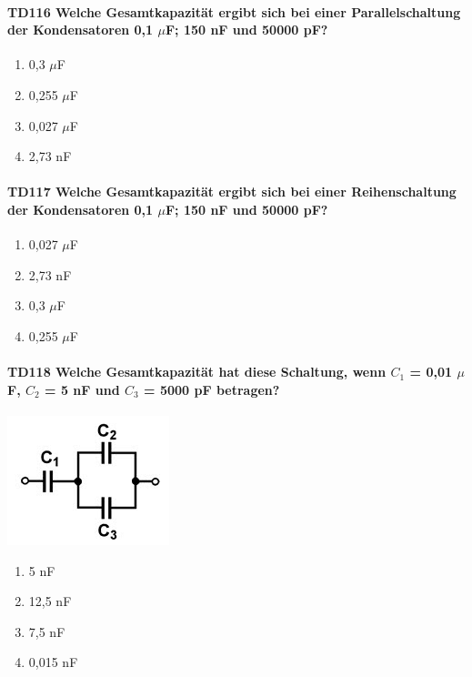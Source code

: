 \documentclass[8pt]{article}
\begin{document}
\begin{enumerate}
\begin{enumerate}[nolistsep,label=\Alph*]
\paragraph*{TD116 Welche Gesamtkapazität ergibt sich bei einer Parallelschaltung der Kondensatoren 0,1 $\mu$F; 150 nF und 50000 pF?}
\begin{enumerate}[nolistsep,label=\Alph*]
\item 0,3 $\mu$F
\item 0,255 $\mu$F
\item 0,027 $\mu$F
\item 2,73 nF
\end{enumerate}

\paragraph*{TD117 Welche Gesamtkapazität ergibt sich bei einer Reihenschaltung der Kondensatoren 0,1 $\mu$F; 150 nF und 50000 pF?}
\begin{enumerate}[nolistsep,label=\Alph*]
\item 0,027 $\mu$F
\item 2,73 nF
\item 0,3 $\mu$F
\item 0,255 $\mu$F
\end{enumerate}

\paragraph*{TD118 Welche Gesamtkapazität hat diese Schaltung, wenn $C_{1}$ = 0,01 $\mu$F, $C_{2}$ = 5 nF und $C_{3}$ = 5000 pF betragen?}
\begin{center}
	\begin{minipage}{\linewidth}
		\centering
		\includegraphics[scale=1.0]{pics/td118_a.jpg}
	\end{minipage}
\end{center}
\begin{enumerate}[nolistsep,label=\Alph*]
\item 5 nF
\item 12,5 nF
\item 7,5 nF
\item 0,015 nF
\end{enumerate}


\end{enumerate}
\end{enumerate}
\end{document}
